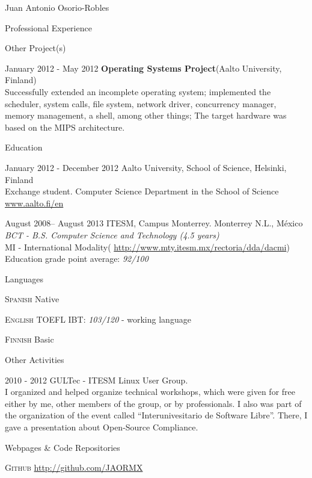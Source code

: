 \documentclass[english,10pt,letterpaper]{article}
\begin{document}
\begin{cv}{Juan Antonio Osorio-Robles}
\begin{cvlist}{Professional Experience}
	\end{cvlist}

    \begin{cvlist}{Other Project(s)}
		\item [January 2012 - May 2012]
            \textbf{Operating Systems Project}(Aalto University, Finland)\\
            Successfully extended an incomplete operating system; implemented
            the scheduler, system calls, file system, network driver,
            concurrency manager, memory management, a shell, among other
            things; The target hardware was based on the MIPS architecture.
	\end{cvlist}

	\begin{cvlist}{Education}
		\item [January 2012 - December 2012]
			Aalto University, School of Science, Helsinki, Finland\\
			Exchange student. Computer Science Department in the School of
            Science\\
			\href{www.aalto.fi/en}{www.aalto.fi/en}

		\item	[August 2008-- August 2013]
			ITESM, Campus Monterrey. Monterrey N.L., M\'{e}xico\\
			\emph{BCT - B.S. Computer Science and Technology (4.5 years)}\\
			MI - International Modality(
            \href{http://www.mty.itesm.mx/rectoria/dda/dacmi}
            {http://www.mty.itesm.mx/rectoria/dda/dacmi})\\
			Education grade point average: \emph{92/100}
	\end{cvlist}

	\begin{cvlist}{Languages}
		\item [\textsc {Spanish}]
				Native
		\item [\textsc {English}]
				TOEFL IBT: \emph{103/120} - working language
		\item [\textsc {Finnish}]
				Basic
		\end{cvlist}

	\begin{cvlist}{Other Activities}
		\item [2010 - 2012] GULTec - ITESM Linux User Group.\\
			I organized and helped organize technical workshops, which were
            given for free either by me, other members of the group, or by
            professionals. I also was part of the organization of the event
            called ``Interunivesitario de Software Libre''. There, I gave a
            presentation about Open-Source Compliance.
    \end{cvlist}

	\begin{cvlist}{Webpages \& Code Repositories}
        \item [\textsc{Github}]
            \href{http://github.com/JAORMX}{http://github.com/JAORMX}
	\end{cvlist}

\end{cv}
\end{document}
